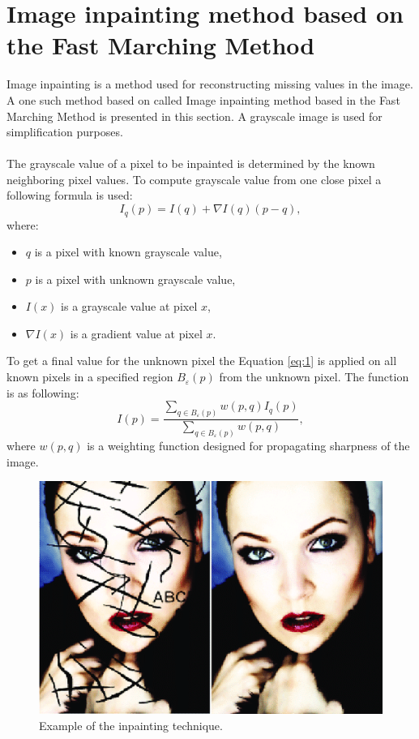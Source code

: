 \documentclass[twoside]{ctuthesis}
\theoremstyle{plain}
\theoremstyle{definition}
\theoremstyle{note}
\begin{document}
\section{Image inpainting method based on the Fast Marching Method} \label{inpainting}
Image inpainting is a method used for reconstructing missing values in the image. A one such method based on  called Image inpainting method based in the Fast Marching Method is presented in this section. A grayscale image is used for simplification purposes.\\
\\
The grayscale value of a pixel to be inpainted is determined by the known neighboring pixel values. To compute grayscale value from one close pixel a following formula is used:
\begin{equation} \label{eq:1}
	I_q(p)=I(q)+\nabla I(q)(p-q),
\end{equation}
where:
\begin{itemize}
	\item $q$ is a pixel with known grayscale value,
	\item $p$ is a pixel with unknown grayscale value,
	\item $I(x)$ is a grayscale value at pixel $x$,
	\item $\nabla I(x)$ is a gradient value at pixel $x$.
\end{itemize}
To get a final value for the unknown pixel the Equation \ref{eq:1} is applied on all known pixels in a specified region $B_{\varepsilon}(p)$ from the unknown pixel. The function is as following:
\begin{equation}
	I(p)=\frac{\sum_{q\in B_{\varepsilon}(p)}w(p,q)I_q(p)}{\sum_{q\in B_{\varepsilon}(p)}w(p,q)},
\end{equation}
where $w(p,q)$ is a weighting function designed for propagating sharpness of the image.\\
\begin{figure}[h!]
	\caption{Example of the inpainting technique.}
	\includegraphics[width=\textwidth]{inpaint_example.png}
	\centering
\end{figure}\\
\end{document}
